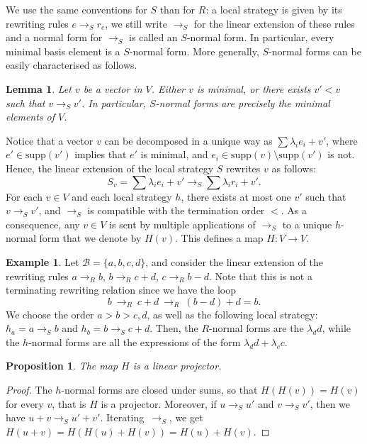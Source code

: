 \documentclass[10pt]{easychair}
\newtheorem{lemma}[theorem]{Lemma}
\newtheorem{proposition}[theorem]{Proposition}
\theoremstyle{definition}
\newtheorem{example}[theorem]{Example}
\newcommand\supp{\text{supp}}
\newcommand\basis{\mathscr{B}}
\newcommand\rewR{\to_R}
\newcommand\rewS{\to_S}
\begin{document}
We use the same conventions for $S$
than for $R$: a local strategy is given by its rewriting rules
$e\rewS r_e$, we still write $\rewS$ for the linear extension of these
rules and a normal form for $\rewS$ is called an $S$-normal form. In
particular, every minimal basis element is a $S$-normal form. More
generally, $S$-normal forms can be easily characterised as follows.

\begin{lemma}\label{lem:h_normal_forms}
  Let $v$ be a vector in $V$. Either $v$ is minimal, or there exists
  $v'<v$ such that $v\rewS v'$. In particular, $S$-normal forms are
  precisely the minimal elements of $V$.
\end{lemma}
\medskip

Notice that a vector $v$ can be
decomposed in a unique way as $\sum\lambda_ie_i+v'$, where
$e'\in\supp(v')$ implies that $e'$ is minimal, and
$e_i\in\supp(v)\setminus\supp(v')$ is not. Hence, the linear extension of
the local strategy $S$ rewrites $v$ as follows:
\begin{equation}\label{equ:well-formed_rewriting_step}
  S_v = \sum\lambda_ie_i+v'\rewS\sum\lambda_ir_i+v'.
\end{equation}
For each $v\in V$ and each local strategy $h$, there exists at most one
$v'$ such that $v \rewS v'$, and $\rewS$ is compatible with the
termination order $<$. As a consequence, any $v\in V$ is sent by multiple
applications of $\rewS$ to a unique $h$-normal form that we denote by
$H(v)$. This defines a map $H :V\to V$.  


\begin{example}\label{ex:h_norma_form}
  Let $\basis=\{a,b,c,d\}$, and consider the linear extension of the
  rewriting rules $a\rewR b$, $b\rewR c+d$, $c\rewR b-d$. Note that this
  is not a terminating rewriting relation since we have the loop
  \[b\ \rewR\ c+d\ \rewR\ (b-d)+d=b.\]
  We choose the order $a>b>c,d$, as well as the following local strategy:
  $h_a=a\rewS b$ and $h_b=b\rewS c+d$. Then, the $R$-normal forms are the
  $\lambda_dd$, while the $h$-normal forms are all the expressions of the
  form $\lambda_dd+\lambda_cc$.
\end{example}


\begin{proposition}\label{prop:linearity_of_H}
  The map $H$ is a linear projector.
\end{proposition}

\begin{proof}
  The $h$-normal forms are closed under sums, so that $H(H(v))=H(v)$ for
  every $v$, that is $H$ is a projector. Moreover, if $u\rewS u'$ and
  $v\rewS v'$, then we have $u+v\rewS u'+v'$. Iterating~$\rewS$, we get
  $H(u+v)=H(H(u)+H(v))=H(u)+H(v)$. 
\end{proof}
\end{document}
